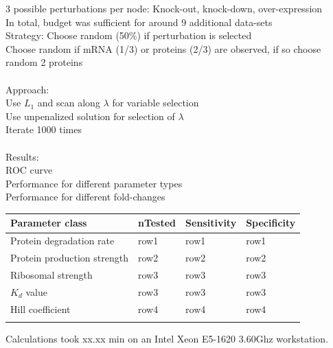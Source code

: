\documentclass{bioinfo}
\begin{document}
3 possible perturbations per node: Knock-out, knock-down, over-expression\\
In total, budget was sufficient for around 9 additional data-sets\\
Strategy: Choose random (50\%) if perturbation is selected\\
Choose random if mRNA (1/3) or proteins (2/3) are observed, if so choose random 2 proteins\\ \\
Approach:\\
Use $L_1$ and scan along $\lambda$ for variable selection\\
Use unpenalized solution for selection of $\lambda$\\
Iterate 1000 times\\ \\
Results:\\
ROC curve\\
Performance for different parameter types\\
Performance for different fold-changes

\begin{table}[!t]
 {\begin{tabular}{@{}llll@{}}\toprule Parameter class &
nTested & Sensitivity & Specificity\\\midrule
Protein degradation rate & row1 & row1 & row1\\
Protein production strength & row2 & row2 & row2\\
Ribosomal strength & row3 & row3 & row3\\
$K_d$ value & row3 & row3 & row3\\
Hill coefficient & row4 & row4 & row4\\\botrule
\end{tabular}}{Calculations took xx.xx min on an Intel Xeon E5-1620 3.60Ghz workstation.}
\end{table}


%
%
\end{document}
